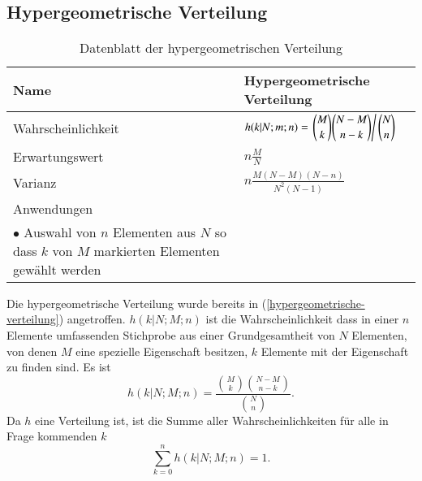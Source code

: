 %
%
%
\subsection{Hypergeometrische Verteilung} \label{section-hypergeometrischeverteilung}
\begin{table}
\renewcommand{\arraystretch}{1.5}
\begin{center}
\begin{tabular}{|l|l|}
\hline
Name&Hypergeometrische Verteilung\\
\hline
Wahrscheinlichkeit&
\begin{minipage}{3.7in}
\vskip3pt
$\displaystyle
h(k|N;m;n)=
\left.\binom{M}{k}\binom{N-M}{n-k}\right/\binom{N}{n}
$
\end{minipage}
\\[10pt]
Erwartungswert&$\displaystyle n\frac{M}{N}$\\[10pt]
Varianz&$\displaystyle
n\frac{M(N-M)(N-n)}{N^2(N-1)}
$\\[10pt]
\hline
Anwendungen&\begin{minipage}{3.7in}%
\vskip3pt
\strut
$\bullet$ Lotto\\
$\bullet$ Auswahl von $n$ Elementen aus $N$ so dass $k$ von $M$ markierten
Elementen gewählt werden
\strut
\end{minipage}\\[18pt]
\hline
\end{tabular}
\end{center}
\caption{Datenblatt der hypergeometrischen Verteilung\label{datenblatt:hypergeometrischeverteilung}}
\end{table}

Die hypergeometrische Verteilung wurde bereits in
(\ref{hypergeometrische-verteilung}) angetroffen.
$h(k|N;M;n)$ ist die
Wahrscheinlichkeit dass in einer $n$ Elemente umfassenden Stichprobe aus
einer Grundgesamtheit von $N$ Elementen, von denen $M$ eine spezielle
Eigenschaft besitzen, $k$ Elemente mit der Eigenschaft zu finden sind.
Es ist
\[
h(k|N;M;n)=\frac{\binom{M}{k}\binom{N-M}{n-k}}{\binom{N}{n}}.
\]
Da $h$ eine Verteilung ist, ist die Summe aller Wahrscheinlichkeiten
für alle in Frage kommenden $k$
\[
\sum_{k=0}^nh(k|N;M;n)=1.
\]
